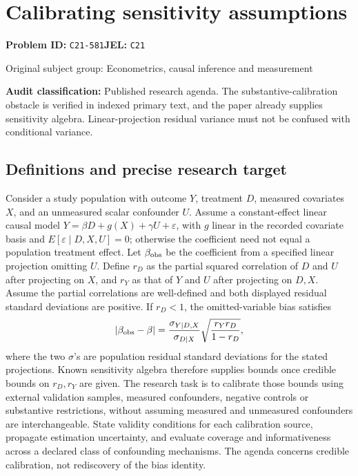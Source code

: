 \documentclass[11pt,a4paper]{article}
\begin{document}
\section*{Calibrating sensitivity assumptions}
\textbf{Problem ID:} \texttt{C21-581}\quad \textbf{JEL:} \texttt{C21}\par
\label{problem:OP-0422}
{\sffamily\small\color{muted}Original subject group: Econometrics, causal inference and measurement\par}
\label{definitions:problem:30007704}
\textbf{Audit classification:} Published research agenda. The substantive-calibration obstacle is verified in indexed primary text, and the paper already supplies sensitivity algebra. Linear-projection residual variance must not be confused with conditional variance.
\subsection*{Definitions and precise research target}
Consider a study population with outcome \(Y\), treatment \(D\), measured covariates \(X\), and an unmeasured scalar confounder \(U\). Assume a constant-effect linear causal model \(Y=\beta D+g(X)+\gamma U+\varepsilon\), with \(g\) linear in the recorded covariate basis and \(E[\varepsilon\mid D,X,U]=0\); otherwise the coefficient need not equal a population treatment effect. Let \(\beta_{\rm obs}\) be the coefficient from a specified linear projection omitting \(U\). Define \(r_D\) as the partial squared correlation of \(D\) and \(U\) after projecting on \(X\), and \(r_Y\) as that of \(Y\) and \(U\) after projecting on \(D,X\). Assume the partial correlations are well-defined and both displayed residual standard deviations are positive. If \(r_D<1\), the omitted-variable bias satisfies
\[
|\beta_{\rm obs}-\beta|=\frac{\sigma_{Y\mid D,X}}{\sigma_{D\mid X}}\sqrt{\frac{r_Yr_D}{1-r_D}},
\]
where the two \(\sigma\)'s are population residual standard deviations for the stated projections. Known sensitivity algebra therefore supplies bounds once credible bounds on \(r_D,r_Y\) are given. The research task is to calibrate those bounds using external validation samples, measured confounders, negative controls or substantive restrictions, without assuming measured and unmeasured confounders are interchangeable. State validity conditions for each calibration source, propagate estimation uncertainty, and evaluate coverage and informativeness across a declared class of confounding mechanisms. The agenda concerns credible calibration, not rediscovery of the bias identity.
\end{document}
